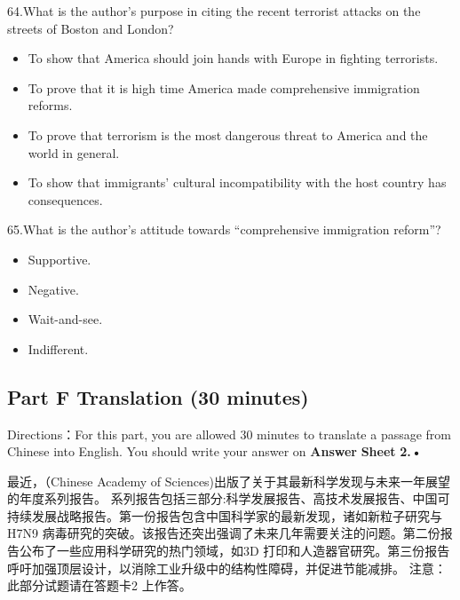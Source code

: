 \documentclass[UTF8,11pt]{ctexart}
\begin{document}
64.What is the author’s purpose in citing the recent terrorist attacks on the streets of Boston and London?


\begin{itemize}[leftmargin=2em,itemsep=.2em,topsep=.4em]\item[A.] To show that America should join hands with Europe in fighting terrorists.
\item[B.] To prove that it is high time America made comprehensive immigration reforms.
\item[C.] To prove that terrorism is the most dangerous threat to America and the world in general.
\item[D.] To show that immigrants’ cultural incompatibility with the host country has consequences.
\end{itemize}

65.What is the author’s attitude towards “comprehensive immigration reform”?


\begin{itemize}[leftmargin=2em,itemsep=.2em,topsep=.4em]\item[A.] Supportive.
\item[B.] Negative.
\item[C.] Wait-and-see.
\item[D.] Indifferent.
\end{itemize}

\subsection*{Part F Translation (30 minutes)}


Directions：For this part, you are allowed 30 minutes to translate a passage from Chinese into English. You should write your answer on\textbf{ Answer} \textbf{Sheet} \textbf{2.•}


最近，（Chinese Academy of Sciences)出版了关于其最新科学发现与未来一年展望的年度系列报告。 系列报告包括三部分:科学发展报告、高技术发展报告、中国可持续发展战略报告。第一份报告包含中国科学家的最新发现，诸如新粒子研究与H7N9 病毒研究的突破。该报告还突出强调了未来几年需要关注的问题。第二份报告公布了一些应用科学研究的热门领域，如3D 打印和人造器官研究。第三份报告呼吁加强顶层设计，以消除工业升级中的结构性障碍，并促进节能减排。 注意：此部分试题请在答题卡2 上作答。
\end{document}
